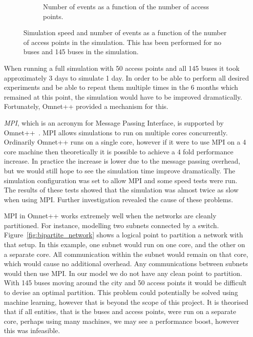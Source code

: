 \begin{figure}
\begin{subfigure}{0.45\textwidth}
                \caption{Number of events as a function of the number of access points.}
                \label{fig:access_points_events}
            \end{subfigure}
            \caption{Simulation speed and number of events as a function of the number of access points in the simulation. This has been performed for no buses and 145 buses in the simulation.}
            \label{fig:access_points_vs_time_and_events}
        \end{figure}

        When running a full simulation with 50 access points and all 145 buses it took approximately 3 days to simulate 1 day. In order to be able to perform all desired experiments and be able to repeat them multiple times in the 6 months which remained at this point, the simulation would have to be improved dramatically. Fortunately, Omnet++ provided a mechanism for this. 

        \emph{MPI}, which is an acronym for Message Passing Interface, is supported by Omnet++~\cite{omnetmpi}. MPI allows simulations to run on multiple cores concurrently. Ordinarily Omnet++ runs on a single core, however if it were to use MPI on a 4 core machine then theoretically it is possible to achieve a 4 fold performance increase. In practice the increase is lower due to the message passing overhead, but we would still hope to see the simulation time improve dramatically. The simulation configuration was set to allow MPI and some speed tests were run. The results of these tests showed that the simulation was almost twice as slow when using MPI. Further investigation revealed the cause of these problems. 

        

        MPI in Omnet++ works extremely well when the networks are cleanly partitioned. For instance, modelling two subnets connected by a switch. Figure~\ref{fig:bipartite_network} shows a logical point to partition a network with that setup. In this example, one subnet would run on one core, and the other on a separate core. All communication within the subnet would remain on that core, which would cause no additional overhead. Any communications between subnets would then use MPI. In our model we do not have any clean point to partition. With 145 buses moving around the city and 50 access points it would be difficult to devise an optimal partition. This problem could potentially be solved using machine learning, however that is beyond the scope of this project. It is theorised that if all entities, that is the buses and access points, were run on a separate core, perhaps using many machines, we may see a performance boost, however this was infeasible. 

